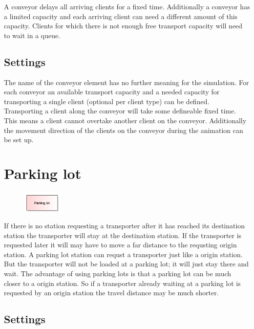 A conveyor delays all arriving clients for a fixed time.
Additionally a conveyor has a limited capacity and each
arriving client can need a different amount of this capacity.
Clients for which there is not enough free transport capacity
will need to wait in a queue.

\subsection*{Settings}

The name of the conveyor element has no further meaning for the simulation.
For each conveyor an available transport capacity and a needed capacity for
transporting a single client (optional per client type) can be defined.
Transporting a client along the conveyor will take some defineable fixed
time. This means a client cannot overtake another client on the conveyor.
Additionally the movement direction of the clients on the conveyor during
the animation can be set up.


\section{Parking lot}
\label{ref:ModelElementTransportParking}

\begin{figure}
\vspace{-22pt}
\includegraphics[width=2cm]{imageModelElementTransportParking.png}
\vspace{-22pt}
\end{figure}

If there is no station requesting a transporter after it has reached its
destination station the transporter will stay at the destination station. 
If the transporter is requested later it will may have to move a far distance
to the requsting origin station. A parking lot station can requst a transporter
just like a origin station. But the transporter will not be loaded at a parking lot;
it will just stay there and wait. The advantage of using parking lots is that
a parking lot can be much closer to a origin station. So if a transporter
already waiting at a parking lot is requested by an origin station the
travel distance may be much shorter.

\subsection*{Settings}

